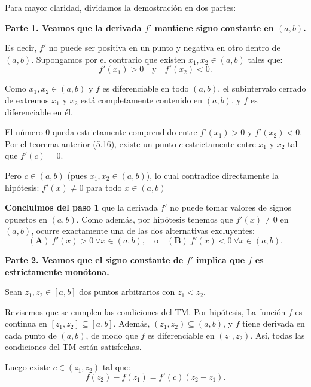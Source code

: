 \begin{prueba}
    Para mayor claridad, dividamos la demostración en dos partes:
	
	\vspace{0.2cm}
	\noindent \textbf{Parte 1. Veamos que la derivada $f'$ mantiene signo constante en $(a, b)$.}  
	
	Es decir, $f'$ no puede ser positiva en un punto y negativa en otro dentro de $(a, b)$. Supongamos por el contrario que existen $x_1, x_2 \in (a, b)$ tales que:
	\begin{equation*}
		f'(x_1) > 0 \quad \text{y} \quad f'(x_2) < 0.
	\end{equation*}
	
	Como $x_1, x_2 \in (a, b)$ y $f$ es diferenciable en todo $(a, b)$, el subintervalo cerrado de extremos $x_1$ y $x_2$ está completamente contenido en $(a, b)$, y $f$ es diferenciable en él.
	
	El número 0 queda estrictamente comprendido entre $f'(x_1) > 0$ y $f'(x_2) < 0$. Por el teorema anterior (5.16), existe un punto $c$ estrictamente entre $x_1$ y $x_2$ tal que $f'(c) = 0$.
	
	Pero $c \in (a, b)$ (pues $x_1, x_2 \in (a, b)$), lo cual contradice directamente la hipótesis: $f'(x) \neq 0$ para todo $x \in (a, b)$
	
	\textbf{Concluimos del paso 1} que la derivada $f'$ no puede tomar valores de signos opuestos en $(a, b)$. Como además, por hipótesis tenemos que $f'(x) \neq 0$ en $(a, b)$, ocurre exactamente una de las dos alternativas excluyentes:
	\begin{equation*}
		\mathbf{(A)} \ f'(x) > 0 \ \forall x \in (a, b), \quad \text{o} \quad \mathbf{(B)} \ f'(x) < 0 \ \forall x \in (a, b).
	\end{equation*}
	
	\vspace{0.2cm}
	\noindent \textbf{Parte 2. Veamos que el signo constante de $f'$ implica que $f$ es estrictamente monótona.}  
	
	Sean $z_1, z_2 \in [a, b]$ dos puntos arbitrarios con $z_1 < z_2$.
	
	Revisemos que se cumplen las condiciones del TM. Por hipótesis, La función $f$ es continua en $[z_1, z_2] \subseteq [a, b]$. Además, $(z_1, z_2) \subseteq (a, b)$, y $f$ tiene derivada en cada punto de $(a, b)$, de modo que $f$ es diferenciable en $(z_1, z_2)$. Así, todas las condiciones del TM están satisfechas.
	
	Luego existe $c \in (z_1, z_2)$ tal que:
	\begin{equation}
		f(z_2) - f(z_1) = f'(c)(z_2 - z_1).
	\end{equation}
	

\end{prueba}
